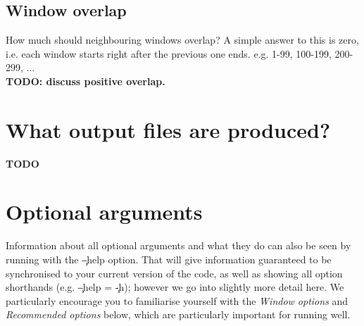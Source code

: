 \subsection{Window overlap}
How much should neighbouring windows overlap?
A simple answer to this is zero, i.e. each window starts right after the previous one ends.
e.g. 1-99, 100-199, 200-299, $\ldots$\\
{\bf TODO: discuss positive overlap.}

\section{What output files are produced?}

{\bf TODO}

\section{Optional arguments}

Information about all optional arguments and what they do can also be seen by running \p with the \c{--help} option.
That will give information guaranteed to be synchronised to your current version of the code, as well as showing all option shorthands (e.g. \c{--help} = \c{-h}); however we go into slightly more detail here.
We particularly encourage you to familiarise yourself with the {\it Window options} and {\it Recommended options} below, which are particularly important for running \p well.

